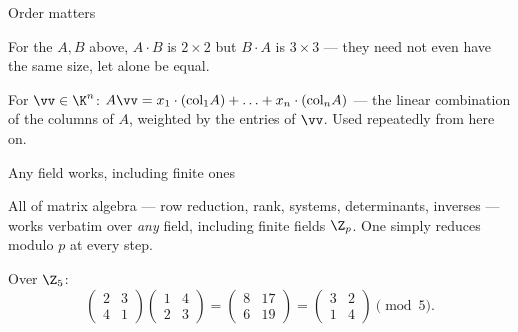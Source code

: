 \begin{frame}{Order matters}
\begin{example}
For the $A,B$ above, $A\cdot B$ is $2\times 2$ but $B\cdot A$ is $3\times 3$ — they need not even have the
same size, let alone be equal.
\end{example}

\pause

\begin{remark}
For $\vv\in\K^n$: $A\vv = x_1\cdot(\text{col}_1 A) + \ldots + x_n\cdot(\text{col}_n A)$ — the linear
combination of the columns of $A$, weighted by the entries of $\vv$. Used repeatedly from here on.
\end{remark}
\end{frame}

\begin{frame}{Any field works, including finite ones}
\begin{remark}
All of matrix algebra — row reduction, rank, systems, determinants, inverses — works verbatim over
\emph{any} field, including finite fields $\Z_p$. One simply reduces modulo $p$ at every step.
\end{remark}

\pause

\begin{example}
Over $\Z_5$:
\[
\left(\begin{smallmatrix} 2 & 3\\ 4 & 1 \end{smallmatrix}\right)
\left(\begin{smallmatrix} 1 & 4\\ 2 & 3 \end{smallmatrix}\right)
= \left(\begin{smallmatrix} 8 & 17\\ 6 & 19 \end{smallmatrix}\right)
= \left(\begin{smallmatrix} 3 & 2\\ 1 & 4 \end{smallmatrix}\right) \pmod 5.
\]
\end{example}
\end{frame}

